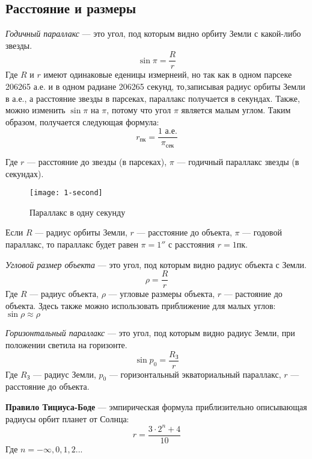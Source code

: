 \subsection{Расстояние и размеры}
\textit{Годичный параллакс} --- это угол, под которым видно орбиту Земли с какой-либо звезды.
\begin{equation}
\sin\pi=\frac{R}{r}
\end{equation}
Где $R$ и $r$ имеют одинаковые еденицы измернеий, но так как в одном парсеке 206265 а.е. и в одном радиане 206265 секунд, то,записывая радиус орбиты Земли в а.е., а расстояние звезды в парсеках, параллакс получается в секундах. Также, можно изменить $\sin\pi$ на $\pi$, потому что угол $\pi$ является малым углом. Таким образом, получается следующая формула:\begin{equation}
r_{\text{пк}}=\frac{1\text{ а.е.}}{\pi_{\text{сек}}}
\end{equation}

Где $r$ --- расстояние до звезды (в парсеках), $\pi$ --- годичный параллакс звезды (в секундах).
\begin{figure}[!h]
\centering
\texttt{[image: 1-second]}
\caption{Параллакс в одну секунду}
\end{figure}

Если $R$ --- радиус орбиты Земли, $r$ --- расстояние до объекта, $\pi$ --- годовой параллакс, то параллакс будет равен $\pi=1''$ с расстояния $r=1$пк.

\textit{Угловой размер объекта} --- это угол, под которым видно радиус объекта с Земли.
\begin{equation}\rho=\frac{R}{r}
\end{equation}
Где $R$ --- радиус объекта, $\rho$ --- угловые размеры объекта, $r$ --- растояние до объекта. Здесь также можно использовать приближение для малых углов: $\sin\rho\approx\rho$

\textit{Горизонтальный параллакс} --- это угол, под которым видно радиус Земли, при положении светила на горизонте.
\begin{equation}
\sin p_0=\frac{R_{\text{З}}}{r}
\end{equation}
Где $R_{\text{З}}$ --- радиус Земли, $p_0$ --- горизонтальный экваториальный параллакс, $r$ --- расстояние до объекта.

\textbf{Правило Тициуса-Боде} --- эмпирическая формула приблизительно описывающая радиусы орбит планет от Солнца:
\begin{equation}r=\frac{3\cdot 2^n+4}{10}
\end{equation}
Где $n=-\infty, 0, 1, 2...$

